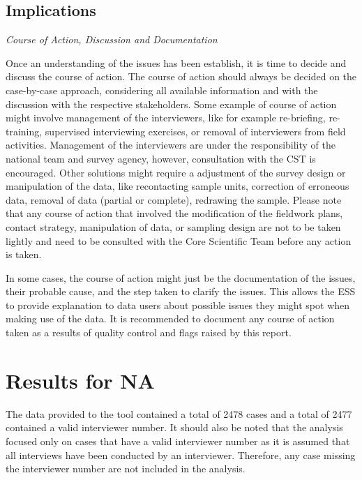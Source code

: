 \documentclass[
  11pt,
  a4paperpaper,
]{article}
\let\stdsection\section
\renewcommand{\section}{\FloatBarrier\clearpage\FloatBarrier\stdsection}
\begin{document}
\hypertarget{implications}{%
\subsection{Implications}\label{implications}}

\emph{Course of Action, Discussion and Documentation}

Once an understanding of the issues has been establish, it is time to
decide and discuss the course of action. The course of action should
always be decided on the case-by-case approach, considering all
available information and with the discussion with the respective
stakeholders. Some example of course of action might involve management
of the interviewers, like for example re-briefing, re-training,
supervised interviewing exercises, or removal of interviewers from field
activities. Management of the interviewers are under the responsibility
of the national team and survey agency, however, consultation with the
CST is encouraged. Other solutions might require a adjustment of the
survey design or manipulation of the data, like recontacting sample
units, correction of erroneous data, removal of data (partial or
complete), redrawing the sample. Please note that any course of action
that involved the modification of the fieldwork plans, contact strategy,
manipulation of data, or sampling design are not to be taken lightly and
need to be consulted with the Core Scientific Team before any action is
taken.

In some cases, the course of action might just be the documentation of
the issues, their probable cause, and the step taken to clarify the
issues. This allows the ESS to provide explanation to data users about
possible issues they might spot when making use of the data. It is
recommended to document any course of action taken as a results of
quality control and flags raised by this report.

\hypertarget{results-for-na}{%
\section{Results for NA}\label{results-for-na}}

The data provided to the tool contained a total of 2478 cases and a
total of 2477 contained a valid interviewer number. It should also be
noted that the analysis focused only on cases that have a valid
interviewer number as it is assumed that all interviews have been
conducted by an interviewer. Therefore, any case missing the interviewer
number are not included in the analysis.
\end{document}
